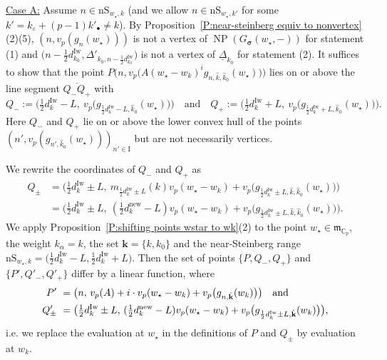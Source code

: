 \documentclass[12pt]{amsart}
\theoremstyle{definition}
\numberwithin{equation}{subsection}
\def\gothm{\mathfrak{m}}
\def\CC{\mathbb{C}}
\def\bfk{\mathbf{k}}
\def\rmI{\mathrm{I}}
\DeclareMathOperator{\NP}{NP}
\newcommand{\bbsigma}{\boldsymbol{\sigma}}
\newcommand{\new}{\mathrm{new}}
\newcommand{\Iw}{\mathrm{Iw}}
\newcommand{\nS}{\mathrm{nS}}
\begin{document}
\underline{Case A:} Assume $n \in \nS_{w_\star,k}$ (and we allow 
$n \in \nS_{w_\star, k'}$ for some $k' =k_\varepsilon + (p-1)k'_\bullet \neq k$). By Proposition~\ref{P:near-steinberg equiv to nonvertex}(2)(5),  $(n, v_p(g_n(w_\star)))$ is not a vertex of $\NP(G_{\bbsigma}(w_\star, -))$ for statement (1) and $\big(n-\frac 12d_{k_0}^\Iw, \Delta'_{k_0, n-\frac 12d_{k_0}^\Iw}\big)$ is not 
a vertex of $\underline \Delta_{k_0}$ for statement (2).  It suffices to show that the point $P\big(n,v_p\big(A(w_\star-w_k)^ig_{n,\hat{ k},\hat{ k}_0}(w_\star)\big)\big)$  lies on or above the line segment $\overline{Q_-Q_+}$ with 
$$
Q_-:= \big( \tfrac 12 d_{k}^\Iw - L,\ v_p\big(g_{\frac 12 d_{k}^\Iw - L,\hat k_0}(w_\star) \big)\big)  \quad \textrm{and} \quad Q_+:=\big(  \tfrac 12 d_{k}^\Iw + L,\ v_p\big(g_{\frac 12 d_{k}^\Iw + L,\hat k_0}(w_\star)\big)\big).
$$
Here $Q_-$ and $Q_+$ lie on or above the lower convex hull of the points $(n',v_p(g_{n',\hat{ k}_0}(w_\star)))_{n'\in \rmI}$ but are not necessarily vertices. 

We rewrite the coordinates of $Q_-$ and $Q_+$ as
\begin{align*}
Q_{\pm}&=\big(\tfrac 12 d_k^\Iw\pm L,\ m_{\frac 12 d_k^\Iw\pm L}(k)v_p(w_\star-w_k)+v_p\big(g_{\frac 12 d_k^\Iw\pm L,\hat{k},\hat{ k}_0}(w_\star) \big) \big)\\
&=\big(\tfrac 12 d_k^\Iw\pm L,\ (\tfrac 12 d_k^\new-L)v_p(w_\star-w_k)+v_p\big(g_{\frac 12 d_k^\Iw\pm L,\hat{k},\hat{ k}_0}(w_\star) \big) \big).
\end{align*}
We apply Proposition~\ref{P:shifting points wstar to wk}(2) to the point $w_\star\in \gothm_{\CC_p}$, the weight $k_\alpha=k$, the set $\bfk=\{k,k_0 \}$ and the near-Steinberg range $\nS_{w_\star, k} = \big( \frac 12 d_k^\Iw -L, \frac 12 d_k^\Iw+L\big)$. Then the set of points $\{P,Q_-,Q_+ \}$ and $\{P', Q'_-, Q'_+ \}$ differ by a linear function, where 
\begin{align*}
P' \ & = \big(n,\, v_p(A)+i\cdot v_p(w_\star-w_k)+v_p\big(g_{n,\hat{ \bfk}}(w_k) \big) \big) \textrm{\quad and}
\\
Q'_\pm \ & = \big(\tfrac 12 d_k^\Iw\pm L,\, (\tfrac 12 d_k^\new-L)v_p(w_\star-w_k)+v_p\big(g_{\frac 12 d_k^\Iw\pm L,\hat{ \bfk}}(w_k) \big) \big),
\end{align*}
i.e. we replace the evaluation at $w_\star$ in the definitions of $P$ and $Q_\pm$ by evaluation at $w_k$.
\end{document}
